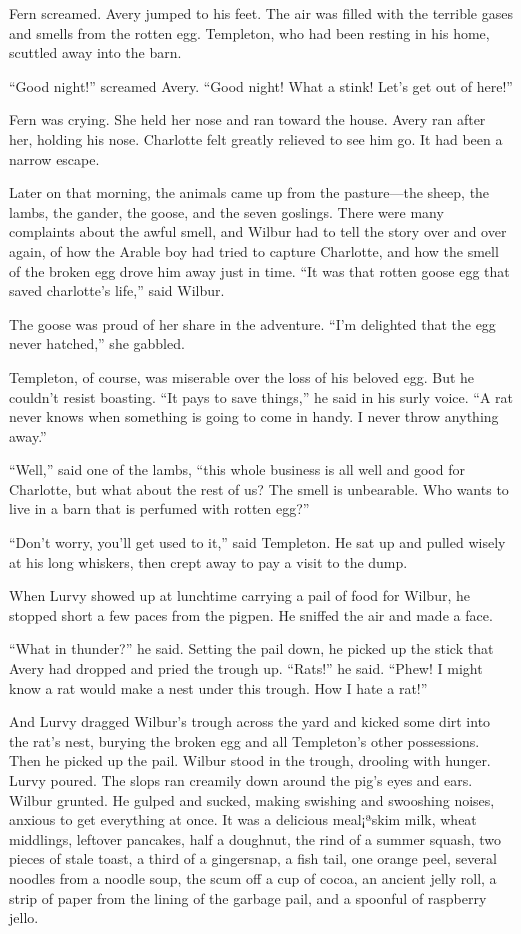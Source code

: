 \documentclass[a4paper, oneside]{book}
\begin{document}
Fern screamed. Avery jumped to his feet. The air was filled
with the terrible gases and smells from the rotten egg. Templeton,
who had been resting in his home, scuttled away into the barn.

``Good night!'' screamed Avery. ``Good night! What a stink!
Let's get out of here!''

Fern was crying. She held her nose and ran toward the house.
Avery ran after her, holding his nose. Charlotte felt greatly relieved
to see him go. It had been a narrow escape.

Later on that morning, the animals came up from the
pasture---the sheep, the lambs, the gander, the goose, and the
seven goslings. There were many complaints about the awful smell,
and Wilbur had to tell the story over and over again, of how the
Arable boy had tried to capture Charlotte, and how the smell of the
broken egg drove him away just in time. ``It was that rotten goose
egg that saved charlotte's life,'' said Wilbur.

The goose was proud of her share in the adventure. ``I'm
delighted that the egg never hatched,'' she gabbled.

Templeton, of course, was miserable over the loss of his
beloved egg. But he couldn't resist boasting. ``It pays to save
things,'' he said in his surly voice. ``A rat never knows when
something is going to come in handy. I never throw anything away.''

``Well,'' said one of the lambs, ``this whole business is all well
and good for Charlotte, but what about the rest of us? The smell is
unbearable. Who wants to live in a barn that is perfumed with
rotten egg?''

``Don't worry, you'll get used to it,'' said Templeton. He sat up
and pulled wisely at his long whiskers, then crept away to pay a
visit to the dump.

When Lurvy showed up at lunchtime carrying a pail of food for
Wilbur, he stopped short a few paces from the pigpen. He sniffed
the air and made a face.

``What in thunder?'' he said. Setting the pail down, he picked
up the stick that Avery had dropped and pried the trough up.
``Rats!'' he said. ``Phew! I might know a rat would make a nest
under this trough. How I hate a rat!''

And Lurvy dragged Wilbur's trough across the yard and kicked
some dirt into the rat's nest, burying the broken egg and all
Templeton's other possessions. Then he picked up the pail. Wilbur
stood in the trough, drooling with hunger. Lurvy poured. The slops
ran creamily down around the pig's eyes and ears. Wilbur grunted.
He gulped and sucked, making swishing and swooshing noises,
anxious to get everything at once. It was a delicious meal¡ªskim
milk, wheat middlings, leftover pancakes, half a doughnut, the rind
of a summer squash, two pieces of stale toast, a third of a
gingersnap, a fish tail, one orange peel, several noodles from a
noodle soup, the scum off a cup of cocoa, an ancient jelly roll, a
strip of paper from the lining of the garbage pail, and a spoonful of
raspberry jello.
\end{document}

